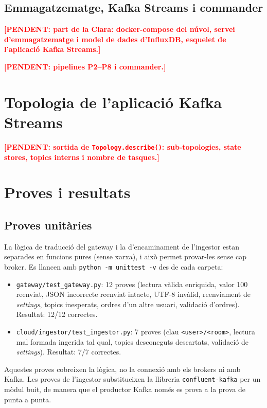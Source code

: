 \documentclass[11pt,a4paper]{article}
\newcommand{\pendent}[1]{\textcolor{red}{\textbf{[PENDENT: #1]}}}
\begin{document}
\subsection{Emmagatzematge, Kafka Streams i commander}
\pendent{part de la Clara: docker-compose del núvol, servei d'emmagatzematge
i model de dades d'InfluxDB, esquelet de l'aplicació Kafka Streams.}

\pendent{pipelines P2--P8 i commander.}

\section{Topologia de l'aplicació Kafka Streams}
\pendent{sortida de \texttt{Topology.describe()}: sub-topologies, state
stores, topics interns i nombre de tasques.}

\section{Proves i resultats}

\subsection{Proves unitàries}
La lògica de traducció del gateway i la d'encaminament de l'ingestor estan
separades en funcions pures (sense xarxa), i això permet provar-les sense
cap broker. Es llancen amb \texttt{python -m unittest -v} des de cada
carpeta:
\begin{itemize}
  \item \texttt{gateway/test\_gateway.py}: 12 proves (lectura vàlida
        enriquida, valor 100 reenviat, JSON incorrecte reenviat intacte,
        UTF-8 invàlid, reenviament de \emph{settings}, topics inesperats,
        ordres d'un altre usuari, validació d'ordres). Resultat: 12/12
        correctes.
  \item \texttt{cloud/ingestor/test\_ingestor.py}: 7 proves (clau
        \texttt{<user>/<room>}, lectura mal formada ingerida tal qual, topics
        desconeguts descartats, validació de \emph{settings}). Resultat: 7/7
        correctes.
\end{itemize}
Aquestes proves cobreixen la lògica, no la connexió amb els brokers ni amb
Kafka. Les proves de l'ingestor substitueixen la llibreria
\texttt{confluent-kafka} per un mòdul buit, de manera que el productor Kafka
només es prova a la prova de punta a punta.
\end{document}
